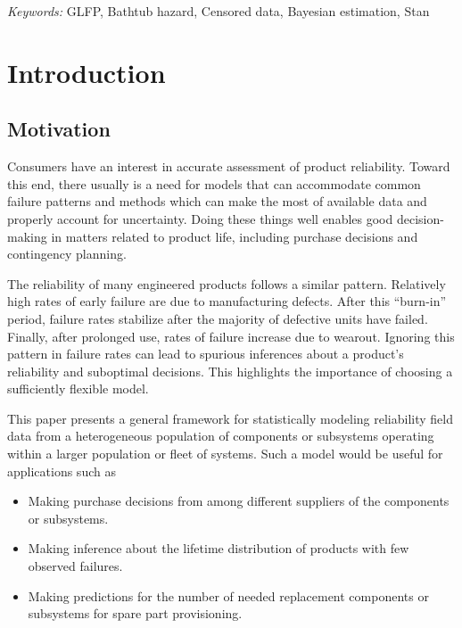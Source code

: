 \documentclass[11pt]{article}
\begin{document}

\noindent%
{\it Keywords:} GLFP, Bathtub hazard, Censored data, Bayesian estimation, Stan
\vfill

\newpage
{} %


\section{Introduction}
\subsection{Motivation}
Consumers have an interest in accurate assessment of product reliability. Toward this end, there usually is a need for models that can accommodate common failure patterns and methods which can make the most of available data and properly account for uncertainty. Doing these things well enables good decision-making in matters related to product life, including purchase decisions and contingency planning.


The reliability of many engineered products follows a similar pattern. Relatively high rates of early failure are due to manufacturing defects.  After this ``burn-in'' period, failure rates stabilize after the majority of defective units have failed.  Finally, after prolonged use, rates of failure increase due to wearout.  Ignoring this pattern in failure rates can lead to spurious inferences about a product's reliability and suboptimal decisions. This highlights the importance of choosing a sufficiently flexible model.



This paper presents a general framework for statistically modeling reliability field data from a heterogeneous population of components or subsystems operating within a larger population or fleet of systems. Such a model would be useful for applications such as

\begin{itemize}
\item Making purchase decisions from among different suppliers of the components or subsystems.
\item Making inference about the lifetime distribution of products with few observed failures.
\item Making predictions for the number of needed replacement components or subsystems for spare part provisioning.
\end{itemize}
\end{document}
